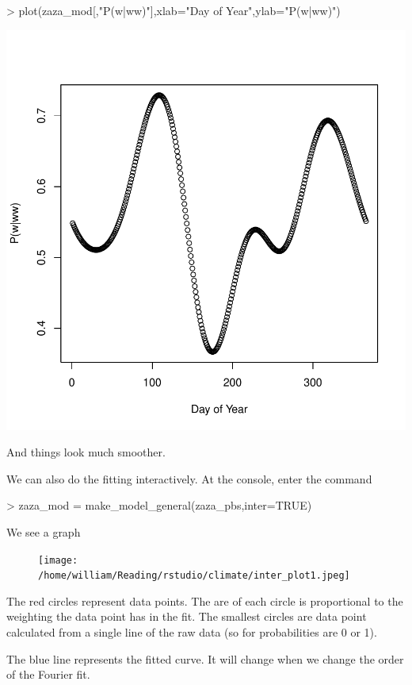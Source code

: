 \documentclass{article}
\begin{document}
\begin{Schunk}
\begin{Sinput}
> plot(zaza_mod[,"P(w|ww)"],xlab="Day of Year",ylab="P(w|ww)")
\end{Sinput}
\end{Schunk}
\includegraphics{climate_vignette-014}

And things look much smoother.   


We can also do the fitting interactively.  At the console, enter the command
\begin{Schunk}
\begin{Sinput}
> zaza_mod = make_model_general(zaza_pbs,inter=TRUE)
\end{Sinput}
\end{Schunk}
We see a graph 

\begin{figure}[h!]
\centering
\texttt{[image: /home/william/Reading/rstudio/climate/inter\_plot1.jpeg]}
\end{figure}

The red circles represent data points.  The are of each circle is proportional
to the weighting the data point has in the fit.  The smallest circles are
data point calculated from a single line of the raw data 
(so for probabilities are 0 or 1).

The blue line represents the fitted curve.  It will change when we change
the order of the Fourier fit.
\end{document}
